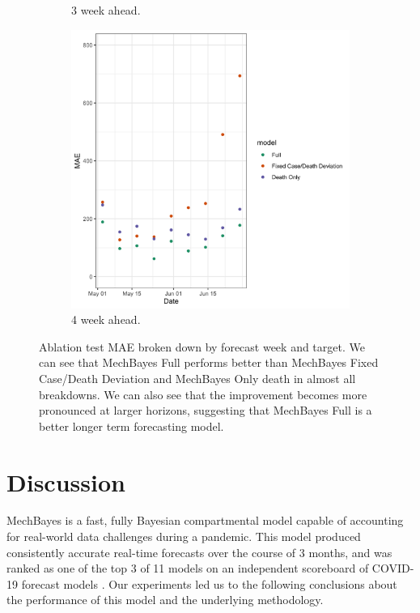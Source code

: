 \documentclass{umassthesis}          %
\begin{document}
\begin{figure}
\begin{subfigure}{.5\textwidth}
    \caption{3 week ahead.}
\end{subfigure}%
\begin{subfigure}{.5\textwidth}
  \centering
    \includegraphics[scale=.15]{ablation_4.png}
    \caption{4 week ahead. }
\end{subfigure}

\caption{Ablation test MAE broken down by forecast week and target. We can see that MechBayes Full performs better than MechBayes Fixed Case/Death Deviation and MechBayes Only death in almost all breakdowns. We can also see that the improvement becomes more pronounced at larger horizons, suggesting that MechBayes Full is a better longer term forecasting model.  }
\label{fig:ablation}
\end{figure}




\section{Discussion}

MechBayes is a fast, fully Bayesian compartmental model capable of accounting for real-world data challenges during a pandemic.  This model produced consistently accurate real-time forecasts over the course of 3 months, and was ranked as one of the top 3 of 11 models on an independent scoreboard of COVID-19 forecast models \cite{yyg}. Our experiments led us to the following conclusions about the performance of this model and the underlying methodology.
\end{document}

